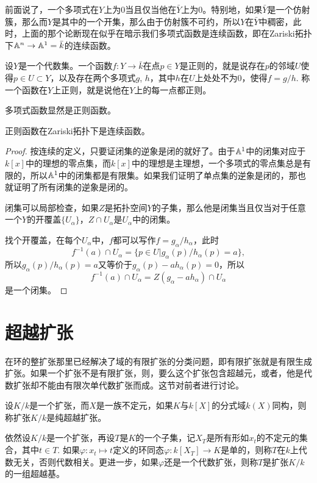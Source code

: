 前面说了，一个多项式在$Y$上为$0$当且仅当他在$\bar{Y}$上为$0$。特别地，如果$\bar{Y}$是一个仿射簇，那么而$Y$是其中的一个开集，那么由于仿射簇不可约，所以$Y$在$\bar{Y}$中稠密，此时，上面的那个论断现在似乎在暗示我们多项式函数是连续函数，即在Zariski拓扑下$\mathbb{A}^n\to \mathbb{A}^1=\bar{k}$的连续函数。

\para 设$Y$是一个代数集。一个函数$f:Y\to \bar{k}$在点$p\in Y$是正则的，就是说存在$p$的邻域$U$使得$p\in U\subset Y$，以及存在两个多项式$g$, $h$，其中$h$在$U$上处处不为$0$，使得$f=g/h$. 称一个函数在$Y$上正则，就是说他在$Y$上的每一点都正则。

多项式函数显然是正则函数。

\begin{pro}
    正则函数在Zariski拓扑下是连续函数。
\end{pro}

\begin{proof}
    按连续的定义，只要证闭集的逆象是闭的就好了。由于$\mathbb{A}^1$中的闭集对应于$k[x]$中的理想的零点集，而$k[x]$中的理想是主理想，一个多项式的零点集总是有限的，所以$\mathbb{A}^1$中的闭集都是有限集。如果我们证明了单点集的逆象是闭的，那也就证明了所有闭集的逆象是闭的。

    闭集可以局部检查，如果$Z$是拓扑空间$Y$的子集，那么他是闭集当且仅当对于任意一个$Y$的开覆盖$\{U_\alpha\}$，$Z\cap U_\alpha$是$U_\alpha$中的闭集。

    找个开覆盖，在每个$U_\alpha$中，$f$都可以写作$f=g_\alpha/h_\alpha$，此时
    \[
        f^{-1}(a)\cap U_\alpha=\bigl\{p\in U| g_\alpha(p)/h_\alpha(p)=a\bigr\},
    \]
    所以$g_\alpha(p)/h_\alpha(p)=a$又等价于$g_\alpha(p)-ah_\alpha(p)=0$，所以
    \[
        f^{-1}(a)\cap U_\alpha=Z(g_\alpha-ah_\alpha)\cap U_\alpha
    \]
    是一个闭集。
\end{proof}

\section{超越扩张}
在环的整扩张那里已经解决了域的有限扩张的分类问题，即有限扩张就是有限生成扩张。如果一个扩张不是有限扩张，则，要么这个扩张包含超越元，或者，他是代数扩张却不能由有限次单代数扩张而成。这节对前者进行讨论。

\begin{para}
设$K/k$是一个扩张，而$X$是一族不定元，如果$K$与$k[X]$的分式域$k(X)$同构，则称扩张$K/k$是纯超越扩张。

依然设$K/k$是一个扩张，再设$T$是$K$的一个子集，记$X_T$是所有形如$x_t$的不定元的集合，其中$t\in T$. 如果$\varphi:x_t\mapsto t$定义的环同态$\varphi:k[X_T]\to K$是单的，则称$T$在$k$上代数无关，否则代数相关。更进一步，如果$\varphi$还是一个代数扩张，则称$T$是扩张$K/k$的一组超越基。
\end{para}

